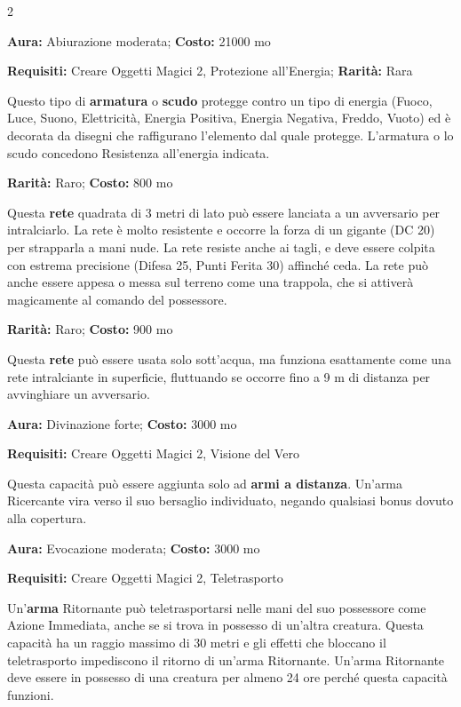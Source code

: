 \begin{multicols}{2}

\textbf{Aura:} Abiurazione moderata; \textbf{Costo:} 21000 mo

\textbf{Requisiti:} Creare Oggetti Magici 2, Protezione all'Energia; \textbf{Rarità:} Rara

Questo tipo di \textbf{armatura} o \textbf{scudo} protegge contro un tipo di energia (Fuoco, Luce, Suono, Elettricità, Energia Positiva, Energia Negativa, Freddo, Vuoto) ed è decorata da disegni che raffigurano l'elemento dal quale protegge. L'armatura o lo scudo concedono Resistenza all'energia indicata.


\textbf{Rarità:} Raro; \textbf{Costo:} 800 mo

Questa \textbf{rete} quadrata di 3 metri di lato può essere lanciata a un avversario per intralciarlo. La rete è molto resistente e occorre la forza di un gigante (DC 20) per strapparla a mani nude. La rete resiste anche ai tagli, e deve essere colpita con estrema precisione (Difesa 25, Punti Ferita 30) affinché ceda. La rete può anche essere appesa o messa sul terreno come una trappola, che si attiverà magicamente al comando del possessore.


\textbf{Rarità:} Raro; \textbf{Costo:} 900 mo

Questa \textbf{rete} può essere usata solo sott'acqua, ma funziona esattamente come una rete intralciante in superficie, fluttuando se occorre fino a 9 m di distanza per avvinghiare un avversario.


\textbf{Aura:} Divinazione forte; \textbf{Costo:} 3000 mo

\textbf{Requisiti:} Creare Oggetti Magici 2, Visione del Vero

Questa capacità può essere aggiunta solo ad \textbf{armi a distanza}. Un'arma Ricercante vira verso il suo bersaglio individuato, negando qualsiasi bonus dovuto alla copertura.


\textbf{Aura:} Evocazione moderata; \textbf{Costo:} 3000 mo

\textbf{Requisiti:} Creare Oggetti Magici 2, Teletrasporto

Un'\textbf{arma} Ritornante può teletrasportarsi nelle mani del suo possessore come Azione Immediata, anche se si trova in possesso di un'altra creatura. Questa capacità ha un raggio massimo di 30 metri e gli effetti che bloccano il teletrasporto impediscono il ritorno di un'arma Ritornante. Un'arma Ritornante deve essere in possesso di una creatura per almeno 24 ore perché questa capacità funzioni.


\end{multicols}
